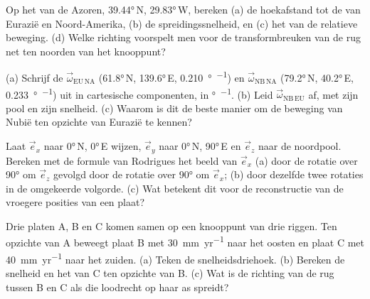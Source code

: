 \begin{exercise}[$\star\star$]\label{exo:b1:plate-kinematics:6}
Op het  van de Azoren, \ang{39.44}\,N, \ang{29.83}\,W, bereken (a) de hoekafstand tot de  van Eurazië en Noord-Amerika, (b) de spreidingssnelheid, en (c) het  van de relatieve beweging. (d) Welke richting voorspelt men voor de transformbreuken van de rug net ten noorden van het knooppunt?
\end{exercise}

\begin{exercise}[$\star\star$]\label{exo:b1:plate-kinematics:7}
(a) Schrijf de  $\vec\omega_{\mathrm{EU\,NA}}$ (\ang{61.8}\,N, \ang{139.6}\,E, \qty{0.210}{\degree\per\Myr}) en $\vec\omega_{\mathrm{NB\,NA}}$ (\ang{79.2}\,N, \ang{40.2}\,E, \qty{0.233}{\degree\per\Myr}) uit in cartesische componenten, in \unit{\degree\per\Myr}. (b) Leid $\vec\omega_{\mathrm{NB\,EU}}$ af, met zijn pool en zijn snelheid. (c) Waarom is dit de beste manier om de beweging van Nubië ten opzichte van Eurazië te kennen?
\end{exercise}

\begin{exercise}[$\star\star$]\label{exo:b1:plate-kinematics:8}
Laat $\vec e_x$ naar \ang{0}\,N, \ang{0}\,E wijzen, $\vec e_y$ naar \ang{0}\,N, \ang{90}\,E en $\vec e_z$ naar de noordpool. Bereken met de formule van Rodrigues het beeld van $\vec e_x$ (a) door de rotatie over \ang{90} om $\vec e_z$ gevolgd door de rotatie over \ang{90} om $\vec e_x$; (b) door dezelfde twee rotaties in de omgekeerde volgorde. (c) Wat betekent dit voor de reconstructie van de vroegere posities van een plaat?
\end{exercise}

\begin{exercise}[$\star\star$]\label{exo:b1:plate-kinematics:9}
Drie platen A, B en C komen samen op een knooppunt van drie riggen. Ten opzichte van A beweegt plaat B met \qty{30}{mm.yr^{-1}} naar het oosten en plaat C met \qty{40}{mm.yr^{-1}} naar het zuiden. (a) Teken de snelheidsdriehoek. (b) Bereken de snelheid en het  van C ten opzichte van B. (c) Wat is de richting van de rug tussen B en C als die loodrecht op haar as spreidt?
\end{exercise}

